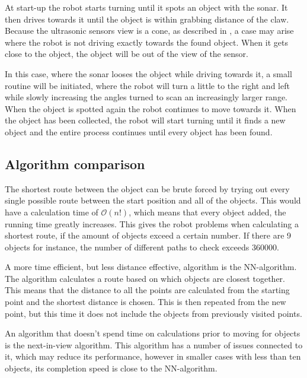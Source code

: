 At start-up the robot starts turning until it spots an object with the sonar. It then drives towards it until the object is within grabbing distance of the claw. Because the ultrasonic sensors view is a cone, as described in , a case may arise where the robot is not driving exactly towards the found object. When it gets close to the object, the object will be out of the view of the sensor. 

In this case, where the sonar looses the object while driving towards it, a small routine will be initiated, where the robot will turn a little to the right and left while slowly increasing the angles turned to scan an increasingly larger range. When the object is spotted again the robot continues to move towards it. When the object has been collected, the robot will start turning until it finds a new object and the entire process continues until every object has been found.


\subsection{Algorithm comparison} \label{sec:algorithm-desc}
The shortest route between the object can be brute forced by trying out every single possible route between the start position and all of the objects. This would have a calculation time of $\mathcal{O}(n!)$, which means that every object added, the running time greatly increases. This gives the robot problems when calculating a shortest route, if the amount of objects exceed a certain number. If there are 9 objects for instance, the number of different paths to check exceeds 360000. 

A more time efficient, but less distance effective, algorithm is the NN-algorithm. The algorithm calculates a route based on which objects are closest together. This means that the distance to all the points are calculated from the starting point and the shortest distance is chosen. This is then repeated from the new point, but this time it does not include the objects from previously visited points.

An algorithm that doesn't spend time on calculations prior to moving for objects is the next-in-view algorithm. This algorithm has a number of issues connected to it, which may reduce its performance, however in smaller cases with less than ten objects, its completion speed is close to the NN-algorithm.


